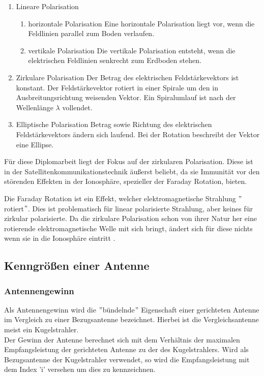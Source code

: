\begin{enumerate}
	\item Lineare Polarisation
	\begin{enumerate}
		\item horizontale Polarisation
		Eine horizontale Polarisation liegt vor, wenn die Feldlinien parallel zum Boden verlaufen.
		\item vertikale Polarisation
		Die vertikale Polarisation entsteht, wenn die elektrischen Feldlinien senkrecht zum Erdboden stehen.
	\end{enumerate}
	\item Zirkulare Polarisation
	Der Betrag des elektrischen Feldstärkevektors ist konstant. Der Feldstärkevektor rotiert in einer Spirale um den in Ausbreitungsrichtung weisenden Vektor. Ein Spiralumlauf ist nach der Wellenlänge $\lambda$ vollendet.
	\item Elliptische Polarisation
	Betrag sowie Richtung des elektrischen Feldstärkevektors ändern sich laufend. Bei der Rotation beschreibt der Vektor eine Ellipse.
\end{enumerate}

Für diese Diplomarbeit liegt der Fokus auf der zirkularen Polarisation. Diese ist in der Satellitenkommunikationstechnik äußerst beliebt, da sie Immunität vor den störenden Effekten in der Ionosphäre, spezieller der Faraday Rotation, bieten.

Die Faraday Rotation ist ein Effekt, welcher elektromagnetische Strahlung $"$rotiert$"$. Dies ist problematisch für linear polarisierte Strahlung, aber keines für zirkular polarisierte. Da die zirkulare Polarisation schon von ihrer Natur her eine rotierende elektromagnetische Welle mit sich bringt, ändert sich für diese nichts wenn sie in die Ionosphäre eintritt \cite{takashi_encyclopedia_2003}.

\subsection{Kenngrößen einer Antenne}

\subsubsection{Antennengewinn}
Als Antennengewinn wird die $"$bündelnde$"$ Eigenschaft einer gerichteten Antenne im Vergleich zu einer Bezugsantenne bezeichnet. Hierbei ist die Vergleichsantenne meist ein Kugelstrahler.\\

Der Gewinn der Antenne berechnet sich mit dem Verhältnis der maximalen Empfangsleistung der gerichteten Antenne zu der des Kugelstrahlers. Wird als Bezugsantenne der Kugelstrahler verwendet, so wird die Empfangsleistung mit dem Index 'i' versehen um dies zu kennzeichnen.

